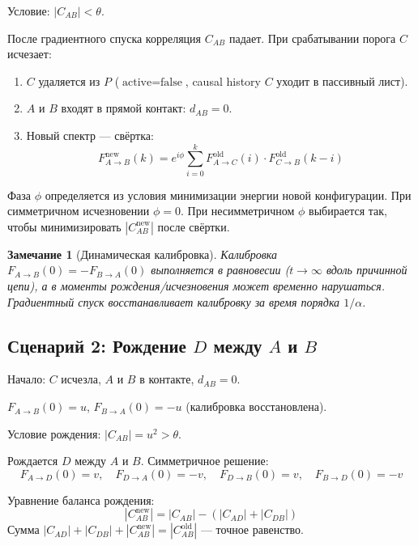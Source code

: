 \documentclass[11pt,a4paper]{article}
\newtheorem{remark}{Замечание}[section]
\theoremstyle{definition}
\begin{document}
Условие: $|C_{AB}| < \theta$.

После градиентного спуска корреляция $C_{AB}$ падает. При срабатывании порога $C$ исчезает:

\begin{enumerate}
    \item $C$ удаляется из $P$ ($\text{active} = \text{false}$, causal history $C$ уходит в пассивный лист).
    \item $A$ и $B$ входят в прямой контакт: $d_{AB} = 0$.
    \item Новый спектр --- свёртка:
    \begin{equation}
        F_{A \to B}^{\text{new}}(k) = e^{i\phi} \sum_{i=0}^{k} F_{A \to C}^{\text{old}}(i) \cdot F_{C \to B}^{\text{old}}(k-i)
    \end{equation}
\end{enumerate}

Фаза $\phi$ определяется из условия минимизации энергии новой конфигурации. При симметричном исчезновении $\phi = 0$. При несимметричном $\phi$ выбирается так, чтобы минимизировать $|C_{AB}^{\text{new}}|$ после свёртки.

\begin{remark}[Динамическая калибровка]
Калибровка $F_{A \to B}(0) = -F_{B \to A}(0)$ выполняется в равновесии ($t \to \infty$ вдоль причинной цепи), а в моменты рождения/исчезновения может временно нарушаться. Градиентный спуск восстанавливает калибровку за время порядка $1/\alpha$.
\end{remark}

\subsection{Сценарий 2: Рождение $D$ между $A$ и $B$}

Начало: $C$ исчезла, $A$ и $B$ в контакте, $d_{AB} = 0$.

$F_{A \to B}(0) = u$, $F_{B \to A}(0) = -u$ (калибровка восстановлена).

Условие рождения: $|C_{AB}| = u^2 > \theta$.

Рождается $D$ между $A$ и $B$. Симметричное решение:
\begin{equation}
    F_{A \to D}(0) = v, \quad F_{D \to A}(0) = -v, \quad F_{D \to B}(0) = v, \quad F_{B \to D}(0) = -v
\end{equation}

Уравнение баланса рождения:
\begin{equation}
    |C_{AB}^{\text{new}}| = |C_{AB}| - (|C_{AD}| + |C_{DB}|)
\end{equation}
Сумма $|C_{AD}| + |C_{DB}| + |C_{AB}^{\text{new}}| = |C_{AB}^{\text{old}}|$ --- точное равенство.
\end{document}
